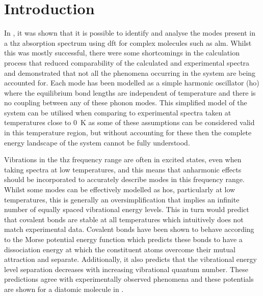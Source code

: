\section{Introduction}
In , it was shown that it is possible to identify and analyse the modes present in a \acrshort{thz} absorption spectrum using \acrshort{dft} for complex molecules such as \acrshort{alm}. Whilst this was mostly successful, there were some shortcomings in the calculation process that reduced comparability of the calculated and experimental spectra and demonstrated that not all the phenomena occurring in the system are being accounted for. Each mode has been modelled as a simple harmonic oscillator (\acrshort{ho}) where the equilibrium bond lengths are independent of temperature and there is no coupling between any of these phonon modes. This simplified model of the system can be utilised when comparing to experimental spectra taken at temperatures close to \SI{0}{K} as some of these assumptions can be considered valid in this temperature region, but without accounting for these then the complete energy landscape of the system cannot be fully understood. 

Vibrations in the \acrshort{thz} frequency range are often in excited states, even when taking spectra at low temperatures, and this means that anharmonic effects should be incorporated to accurately describe modes in this frequency range. Whilst some modes can be effectively modelled as \acrshort{ho}s, particularly at low temperatures, this is generally an oversimplification that implies an infinite number of equally spaced vibrational energy levels. This in turn would predict that covalent bonds are stable at all temperatures which intuitively does not match experimental data. Covalent bonds have been shown to behave according to the Morse potential energy function which predicts these bonds to have a dissociation energy at which the constituent atoms overcome their mutual attraction and separate. Additionally, it also predicts that the vibrational energy level separation decreases with increasing vibrational quantum number. These predictions agree with experimentally observed phenomena and these potentials are shown for a diatomic molecule in . 

